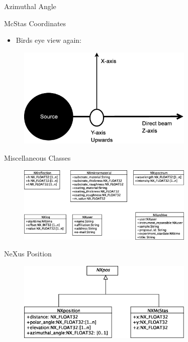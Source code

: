 \documentclass[final,nototal,pdf,mark]{prosper}
\begin{document}
\begin{slide}{Azimuthal Angle }
\begin{center}
\end{center}

\end{slide}\begin{slide}{McStas Coordinates }
\begin{itemize}\item Birds eye view again:
\end{itemize}\begin{center}
\begin{figure}
\includegraphics[width=0.75\textwidth]{mcstas.eps}\end{figure}



\end{center}
\end{slide}\begin{slide}{Miscellaneous Classes }
\begin{center}
\begin{figure}
\includegraphics[width=0.75\textwidth]{nxmisc.eps}\end{figure}



\end{center}
\end{slide}\begin{slide}{NeXus Position }
\begin{center}
\begin{figure}
\includegraphics[width=0.75\textwidth]{nxpos.eps}\end{figure}




\end{center}
\end{slide}
\end{document}
